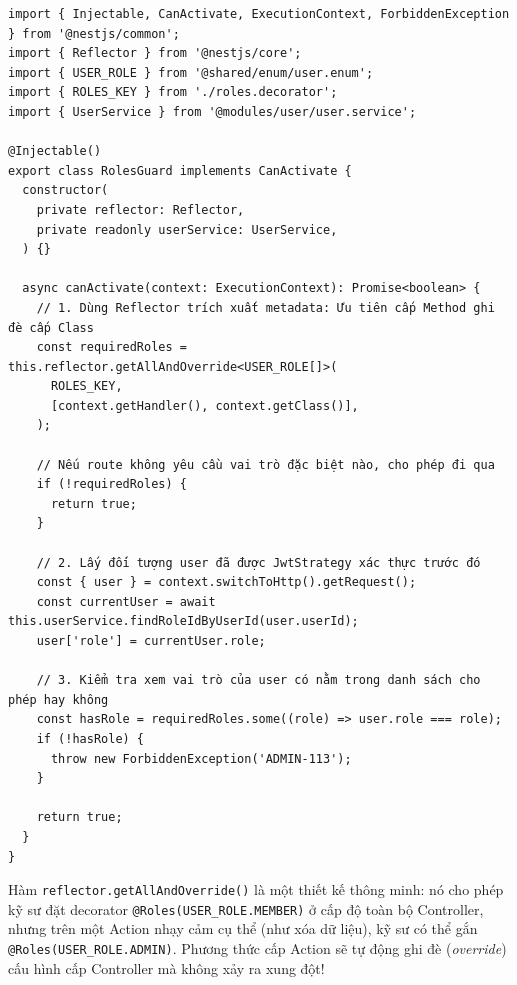\documentclass[12pt,a4paper,oneside]{book}
\begin{document}
\begin{codebox}
\begin{Verbatim}[fontsize=\small]
import { Injectable, CanActivate, ExecutionContext, ForbiddenException } from '@nestjs/common';
import { Reflector } from '@nestjs/core';
import { USER_ROLE } from '@shared/enum/user.enum';
import { ROLES_KEY } from './roles.decorator';
import { UserService } from '@modules/user/user.service';

@Injectable()
export class RolesGuard implements CanActivate {
  constructor(
    private reflector: Reflector,
    private readonly userService: UserService,
  ) {}

  async canActivate(context: ExecutionContext): Promise<boolean> {
    // 1. Dùng Reflector trích xuất metadata: Ưu tiên cấp Method ghi đè cấp Class
    const requiredRoles = this.reflector.getAllAndOverride<USER_ROLE[]>(
      ROLES_KEY,
      [context.getHandler(), context.getClass()],
    );

    // Nếu route không yêu cầu vai trò đặc biệt nào, cho phép đi qua
    if (!requiredRoles) {
      return true;
    }

    // 2. Lấy đối tượng user đã được JwtStrategy xác thực trước đó
    const { user } = context.switchToHttp().getRequest();
    const currentUser = await this.userService.findRoleIdByUserId(user.userId);
    user['role'] = currentUser.role;

    // 3. Kiểm tra xem vai trò của user có nằm trong danh sách cho phép hay không
    const hasRole = requiredRoles.some((role) => user.role === role);
    if (!hasRole) {
      throw new ForbiddenException('ADMIN-113');
    }

    return true;
  }
}
\end{Verbatim}
\end{codebox}

\begin{infobox}
  Hàm \texttt{reflector.getAllAndOverride()} là một thiết kế thông minh: nó cho phép kỹ sư đặt decorator \texttt{@Roles(USER\_ROLE.MEMBER)} ở cấp độ toàn bộ Controller, nhưng trên một Action nhạy cảm cụ thể (như xóa dữ liệu), kỹ sư có thể gắn \texttt{@Roles(USER\_ROLE.ADMIN)}. Phương thức cấp Action sẽ tự động ghi đè (\textit{override}) cấu hình cấp Controller mà không xảy ra xung đột!
\end{infobox}

\end{document}
